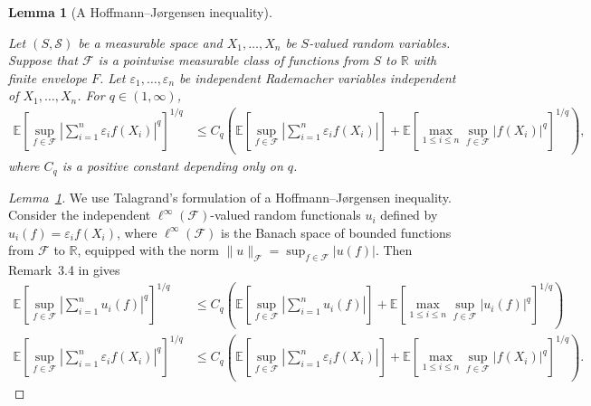 \documentclass[11pt,lof]{puthesis}
\newcommand{\R}{\ensuremath{\mathbb{R}}}
\newcommand{\E}{\ensuremath{\mathbb{E}}}
\newcommand{\cF}{\ensuremath{\mathcal{F}}}
\newcommand{\cS}{\ensuremath{\mathcal{S}}}
\theoremstyle{break}
\newtheorem{lemma}{Lemma}[section]
\theoremstyle{proof}
\newtheorem{proof}{Proof}
\begin{document}
\begin{lemma}[A Hoffmann--J{\o}rgensen inequality]
  \label{lem:kernel_app_hoffmann}

  Let $(S, \cS)$ be a measurable space
  and $X_1, \ldots, X_n$
  be $S$-valued random variables.
  Suppose that
  $\cF$ is a pointwise measurable class of functions from $S$ to $\R$
  with finite envelope $F$.
  Let $\varepsilon_1, \ldots, \varepsilon_n$
  be independent Rademacher variables
  independent of $X_1, \ldots, X_n$.
  For $q \in (1, \infty)$,
  \begin{align*}
    \E \left[
      \sup_{f \in \cF}
      \left|
      \sum_{i=1}^n
      \varepsilon_i
      f(X_i)
      \right|
      ^q
    \right]
    ^{1/q}
    &\leq
    C_q
    \left(
      \E \left[
        \sup_{f \in \cF}
        \left|
        \sum_{i=1}^n
        \varepsilon_i
        f(X_i)
        \right|
      \right]
      +
      \E \left[
        \max_{1 \leq i \leq n}
        \sup_{f \in \cF}
        \big| f(X_i) \big|^q
      \right]^{1/q}
    \right),
  \end{align*}
  where $C_q$ is a positive constant depending only on $q$.

\end{lemma}

\begin{proof}[Lemma~\ref{lem:kernel_app_hoffmann}]

  We use Talagrand's formulation of
  a Hoffmann--J{\o}rgensen inequality.
  Consider the
  independent $\ell^\infty(\cF)$-valued random functionals $u_i$ defined by
  $u_i(f) = \varepsilon_i f(X_i)$, where $\ell^\infty(\cF)$ is the Banach space
  of bounded functions from $\cF$ to $\R$, equipped with the norm $\|u\|_\cF =
  \sup_{f \in \cF} |u(f)|$.
  Then Remark~3.4 in \citet{kwapien1991hypercontraction} gives
  \begin{align*}
    \E \left[
      \sup_{f \in \cF}
      \left|
      \sum_{i=1}^n
      u_i(f)
      \right|
      ^q
    \right]
    ^{1/q}
    &\leq
    C_q
    \left(
      \E \left[
        \sup_{f \in \cF}
        \left|
        \sum_{i=1}^n
        u_i(f)
        \right|
      \right]
      +
      \E \left[
        \max_{1 \leq i \leq n}
        \sup_{f \in \cF}
        \left|
        u_i(f)
        \right|^q
      \right]^{1/q}
    \right) \\
    \E \left[
      \sup_{f \in \cF}
      \left|
      \sum_{i=1}^n
      \varepsilon_i
      f(X_i)
      \right|
      ^q
    \right]
    ^{1/q}
    &\leq
    C_q
    \left(
      \E \left[
        \sup_{f \in \cF}
        \left|
        \sum_{i=1}^n
        \varepsilon_i
        f(X_i)
        \right|
      \right]
      +
      \E \left[
        \max_{1 \leq i \leq n}
        \sup_{f \in \cF}
        \big| f(X_i) \big|^q
      \right]^{1/q}
    \right).
  \end{align*}
\end{proof}
\end{document}
